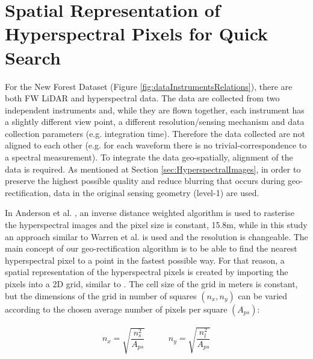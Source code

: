 \documentclass{subfiles}
\begin{document}
	
	
	

	


	
\section{Spatial Representation of Hyperspectral Pixels for Quick Search}\label{sec:SpatialRepresentation}


	\par For the New Forest Dataset (Figure \ref{fig:dataInstrumentsRelations}), there are both FW LiDAR and hyperspectral data. {\color{blue} The data are collected from two independent instruments and, while they are flown together, each instrument has a slightly different view point, a different resolution/sensing mechanism and data collection parameters (e.g. integration time).  Therefore the data collected are not aligned to each other (e.g. for each waveform there is no trivial-correspondence to a spectral measurement).} To integrate the data geo-spatially, alignment of the data is required.  As mentioned at Section \ref{sec:HyperspectralImages}, in order to preserve the highest possible quality and reduce blurring that occurs during geo-rectification, data in the original sensing geometry (level-1) are used.
	
	\par In Anderson et al. \cite{Anderson2008}, an inverse distance weighted algorithm is used to rasterise the hyperspectral images and the pixel size is constant, 15.8m, while in this study an approach similar to Warren et al. \cite{Warren2014} is used and the resolution is changeable. The main concept of our geo-rectification algorithm is to be able to find the nearest hyperspectral pixel to a point in the fastest possible way. For that reason, a spatial representation of the hyperspectral pixels is created by importing the pixels into a 2D grid, similar to \cite{Warren2014}. The cell size of the grid in meters is constant, but the dimensions of the grid in number of squares $(n_x, n_y)$ can be varied according to the chosen average number of pixels per square $(A_{ps})$: 
	
	\begin{eqnarray}
		n_x=\sqrt{\dfrac{n_s^2}{A_{ps}}} \;\;\;\;\;\;\;\;\;\; n_y=\sqrt{\dfrac{n_l^2}{A_{ps}}}   
	\end{eqnarray} 
	
\end{document}
